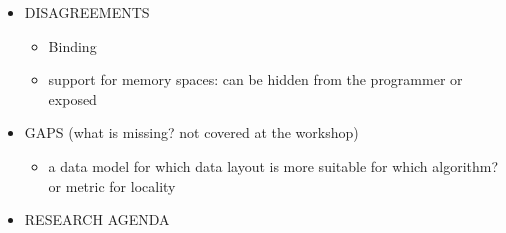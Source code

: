 \begin{itemize}
\item  DISAGREEMENTS
  \begin{itemize}
  \item Binding 
  \item support for memory spaces: can be hidden from the programmer or exposed 
  \end{itemize}

\item GAPS (what is missing? not covered at the workshop)
  \begin{itemize}
  \item a data model for which data layout is more suitable for which algorithm? or metric for locality
  \end{itemize}

\item RESEARCH AGENDA

\end{itemize}


